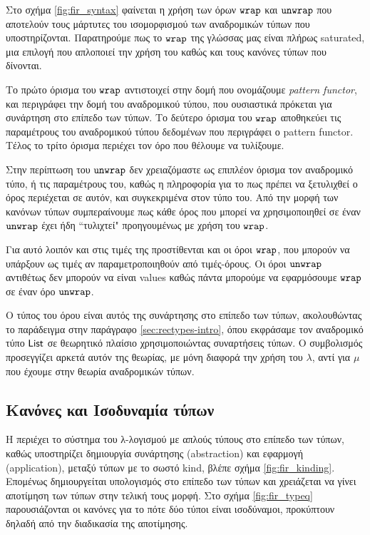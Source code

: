 Στο σχήμα \ref{fig:fir_syntax} φαίνεται η χρήση των όρων $\operatorname{\texttt{wrap}}$ και $\operatorname{\texttt{unwrap}}$ που αποτελούν
τους μάρτυτες του ισομορφισμού των αναδρομικών τύπων που υποστηρίζονται. Παρατηρούμε
πως το $\operatorname{\texttt{wrap}}$ της γλώσσας μας είναι πλήρως saturated, μια επιλογή που απλοποιεί την χρήση 
του καθώς και τους κανόνες τύπων που δίνονται. 

Το πρώτο όρισμα του $\operatorname{\texttt{wrap}}$ αντιστοιχεί στην δομή που ονομάζουμε \emph{pattern functor}, και περιγράφει 
την δομή του αναδρομικού τύπου, που ουσιαστικά πρόκεται για συνάρτηση στο επίπεδο των τύπων.
Το δεύτερο όρισμα του $\operatorname{\texttt{wrap}}$ αποθηκεύει τις παραμέτρους του αναδρομικού τύπου δεδομένων
που περιγράφει ο pattern functor. Τέλος το τρίτο όρισμα περιέχει τον όρο που θέλουμε να τυλίξουμε.

Στην περίπτωση του $\operatorname{\texttt{unwrap}}$ δεν χρειαζόμαστε ως επιπλέον όρισμα τον αναδρομικό τύπο, ή τις παραμέτρους του, καθώς η πληροφορία για το πως πρέπει να ξετυλιχθεί ο όρος περιέχεται σε αυτόν,
και συγκεκριμένα στον τύπο του. Από την μορφή των κανόνων τύπων συμπεραίνουμε πως κάθε όρος
που μπορεί να χρησιμοποιηθεί σε έναν $\operatorname{\texttt{unwrap}}$ έχει ήδη ``τυλιχτεί" προηγουμένως με χρήση του
$\operatorname{\texttt{wrap}}$.

Για αυτό λοιπόν και στις τιμές της \FOMF{} προστίθενται και οι όροι $\operatorname{\texttt{wrap}}$, που μπορούν να υπάρξουν 
ως τιμές αν παραμετροποιηθούν από τιμές-όρους. Οι όροι $\operatorname{\texttt{unwrap}}$ αντιθέτως δεν μπορούν να είναι values
καθώς πάντα μπορούμε να εφαρμόσουμε $\operatorname{\texttt{wrap}}$ σε έναν όρο $\operatorname{\texttt{unwrap}}$.

Ο τύπος του όρου είναι αυτός της συνάρτησης στο επίπεδο των τύπων, ακολουθώντας το παράδειγμα
στην παράγραφο \ref{sec:rectypes-intro}, όπου εκφράσαμε τον αναδρομικό τύπο $\operatorname{\textsf{List}}$ σε θεωρητικό
πλαίσιο χρησιμοποιώντας συναρτήσεις τύπων. Ο συμβολισμός προσεγγίζει αρκετά αυτόν της θεωρίας,
με μόνη διαφορά την χρήση του $\lambda$, αντί για $\mu$ που έχουμε στην θεωρία αναδρομικών τύπων.




\subsection{Κανόνες και Ισοδυναμία τύπων}

H \FOMF{} περιέχει το σύστημα του λ-λογισμού με απλούς τύπους στο επίπεδο των τύπων, καθώς υποστηρίζει
δημιουργία συνάρτησης (abstraction) και εφαρμογή (application), μεταξύ τύπων με το σωστό kind, βλέπε
σχήμα \ref{fig:fir_kinding}. Επομένως δημιουργείται υπολογισμός στο επίπεδο των τύπων και χρειάζεται
να γίνει αποτίμηση των τύπων στην τελική τους μορφή. Στο σχήμα \ref{fig:fir_typeq} παρουσιάζονται οι
κανόνες για το πότε δύο τύποι είναι ισοδύναμοι, προκύπτουν δηλαδή από την διαδικασία της αποτίμησης.


